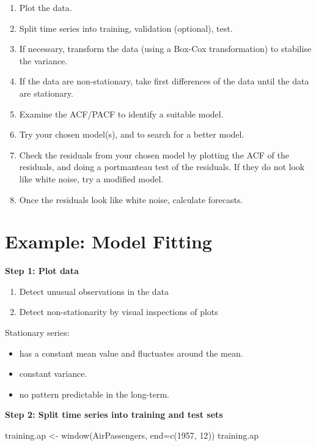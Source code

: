 \documentclass[
  11pt,
  a4paper,
]{report}
\newenvironment{Shaded}{\begin{snugshade}}{\end{snugshade}}
\newcommand{\AttributeTok}[1]{\textcolor[rgb]{0.40,0.45,0.13}{#1}}
\newcommand{\DecValTok}[1]{\textcolor[rgb]{0.68,0.00,0.00}{#1}}
\newcommand{\FunctionTok}[1]{\textcolor[rgb]{0.28,0.35,0.67}{#1}}
\newcommand{\NormalTok}[1]{\textcolor[rgb]{0.00,0.23,0.31}{#1}}
\newcommand{\OtherTok}[1]{\textcolor[rgb]{0.00,0.23,0.31}{#1}}
\begin{document}
\begin{enumerate}
\def\labelenumi{\arabic{enumi}.}
\item
  Plot the data.
\item
  Split time series into training, validation (optional), test.
\item
  If necessary, transform the data (using a Box-Cox transformation) to
  stabilise the variance.
\item
  If the data are non-stationary, take first differences of the data
  until the data are stationary.
\item
  Examine the ACF/PACF to identify a suitable model.
\item
  Try your chosen model(s), and to search for a better model.
\item
  Check the residuals from your chosen model by plotting the ACF of the
  residuals, and doing a portmanteau test of the residuals. If they do
  not look like white noise, try a modified model.
\item
  Once the residuals look like white noise, calculate forecasts.
\end{enumerate}

\section{Example: Model Fitting}\label{example-model-fitting}

\textbf{Step 1: Plot data}

\begin{enumerate}
\def\labelenumi{\arabic{enumi}.}
\item
  Detect unusual observations in the data
\item
  Detect non-stationarity by visual inspections of plots
\end{enumerate}

Stationary series:

\begin{itemize}
\item
  has a constant mean value and fluctuates around the mean.
\item
  constant variance.
\item
  no pattern predictable in the long-term.
\end{itemize}

\textbf{Step 2: Split time series into training and test sets}

\begin{Shaded}
\begin{Highlighting}[]
\NormalTok{training.ap }\OtherTok{\textless{}{-}} \FunctionTok{window}\NormalTok{(AirPassengers, }\AttributeTok{end=}\FunctionTok{c}\NormalTok{(}\DecValTok{1957}\NormalTok{, }\DecValTok{12}\NormalTok{))}
\NormalTok{training.ap}
\end{Highlighting}
\end{Shaded}
\end{document}
